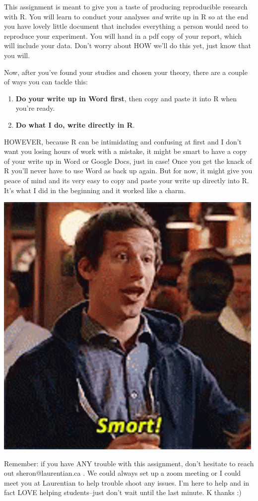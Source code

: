 \documentclass[
]{html}
\theoremstyle{definition}
\theoremstyle{definition}
\theoremstyle{definition}
\theoremstyle{definition}
\theoremstyle{remark}
\begin{document}
This assignment is meant to give you a taste of producing reproducible research with R. You will learn to conduct your analyses \emph{and} write up in R so at the end you have lovely little document that includes everything a person would need to reproduce your experiment. You will hand in a pdf copy of your report, which will include your data. Don't worry about HOW we'll do this yet, just know that you will.

Now, after you've found your studies and chosen your theory, there are a couple of ways you can tackle this:

\begin{enumerate}
\def\labelenumi{\arabic{enumi}.}
\item
  \textbf{Do your write up in Word first}, then copy and paste it into R when you're ready.
\item
  \textbf{Do what I do, write directly in R}.
\end{enumerate}

HOWEVER, because R can be intimidating and confusing at first and I don't want you losing hours of work with a mistake, it might be smart to have a copy of your write up in Word or Google Docs, just in case! Once you get the knack of R you'll never have to use Word as back up again. But for now, it might give you peace of mind and its very easy to copy and paste your write up directly into R. It's what I did in the beginning and it worked like a charm.

\begin{center}\includegraphics[width=0.5\linewidth]{images/smart-brain} \end{center}

Remember: if you have ANY trouble with this assignment, don't hesitate to reach out sheron@laurentian.ca . We could always set up a zoom meeting or I could meet you at Laurentian to help trouble shoot any issues. I'm here to help and in fact LOVE helping students--just don't wait until the last minute. K thanks :)
\end{document}
